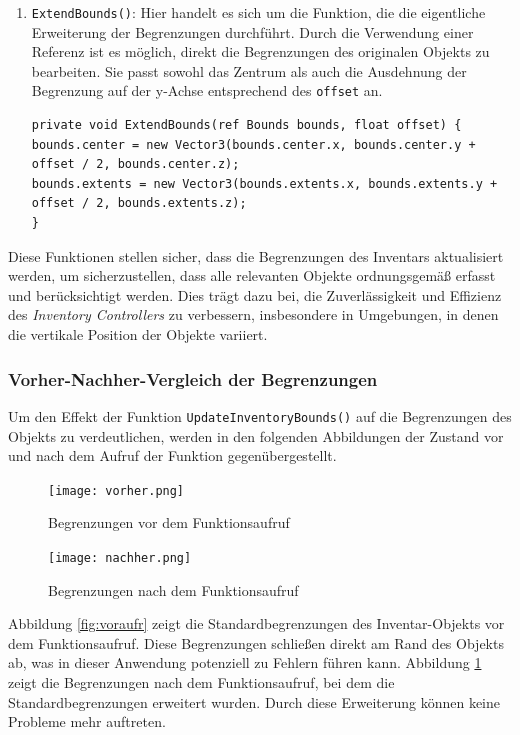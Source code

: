 \begin{itemize}
\begin{enumerate}
\item \texttt{ExtendBounds()}: Hier handelt es sich um die Funktion, die die eigentliche Erweiterung der Begrenzungen
durchführt. Durch die Verwendung einer Referenz ist es möglich, direkt die Begrenzungen des originalen Objekts zu
bearbeiten. Sie passt sowohl das Zentrum als auch die Ausdehnung der Begrenzung auf der y-Achse entsprechend des \texttt{offset} an.
\begin{lstlisting}[language={[Sharp]C}]
private void ExtendBounds(ref Bounds bounds, float offset) {
bounds.center = new Vector3(bounds.center.x, bounds.center.y + offset / 2, bounds.center.z);
bounds.extents = new Vector3(bounds.extents.x, bounds.extents.y + offset / 2, bounds.extents.z);
}
\end{lstlisting}
\end{enumerate}

Diese Funktionen stellen sicher, dass die Begrenzungen des Inventars aktualisiert werden, um sicherzustellen, dass alle
relevanten Objekte ordnungsgemäß erfasst und berücksichtigt werden. Dies trägt dazu bei, die Zuverlässigkeit und Effizienz
des \textit{Inventory Controllers} zu verbessern, insbesondere in Umgebungen, in denen die vertikale Position der Objekte
variiert.

\subsubsection*{Vorher-Nachher-Vergleich der Begrenzungen}
Um den Effekt der Funktion \texttt{UpdateInventoryBounds()} auf die Begrenzungen des Objekts zu verdeutlichen, werden
in den folgenden Abbildungen der Zustand vor und nach dem Aufruf der Funktion gegenübergestellt.

\begin{figure}[H]
    \centering
    \begin{minipage}[b]{0.45\textwidth}
        \centering
        \texttt{[image: vorher.png]}
        \caption{Begrenzungen vor dem Funktionsaufruf}
        \label{fig:voraufr}
    \end{minipage}
    \hfill
    \begin{minipage}[b]{0.45\textwidth}
        \centering
        \texttt{[image: nachher.png]}
        \caption{Begrenzungen nach dem Funktionsaufruf}
        \label{fig:nachaufr}
    \end{minipage}
\end{figure}

Abbildung \ref{fig:voraufr} zeigt die Standardbegrenzungen des Inventar-Objekts vor dem Funktionsaufruf. Diese Begrenzungen
schließen direkt am Rand des Objekts ab, was in dieser Anwendung potenziell zu Fehlern führen kann. Abbildung \ref{fig:nachaufr}
zeigt die Begrenzungen nach dem Funktionsaufruf, bei dem die Standardbegrenzungen erweitert wurden. Durch diese Erweiterung
können keine Probleme mehr auftreten.


\end{itemize}
